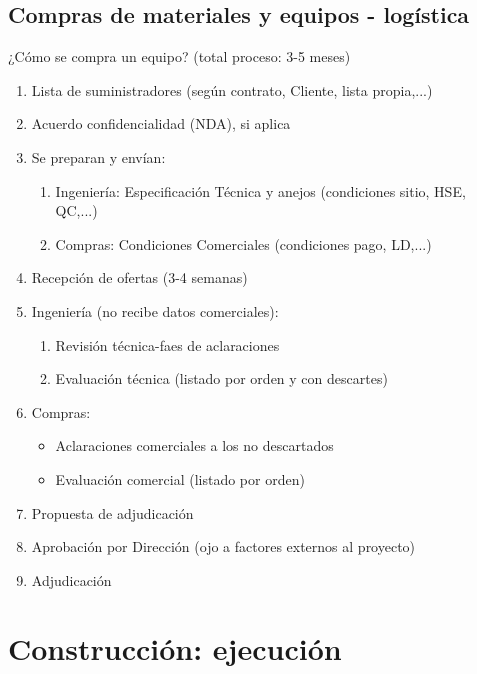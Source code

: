 \subsection*{Compras de materiales y equipos - logística}

¿Cómo se compra un equipo? (total proceso: 3-5 meses)
\begin{enumerate}
    \item Lista de suministradores (según contrato, Cliente, lista propia,...)
    \item Acuerdo confidencialidad (NDA), si aplica
    \item Se preparan y envían:
    \begin{enumerate}
        \item Ingeniería: Especificación Técnica y anejos (condiciones sitio, HSE, QC,...)
        \item Compras: Condiciones Comerciales (condiciones pago, LD,...)
    \end{enumerate}
    \item Recepción de ofertas (3-4 semanas)
    \item Ingeniería (no recibe datos comerciales):
    \begin{enumerate}
        \item Revisión técnica-faes de aclaraciones
        \item Evaluación técnica (listado por orden y con descartes)
    \end{enumerate}
    \item Compras:
    \begin{itemize}
        \item Aclaraciones comerciales a los no descartados
        \item Evaluación comercial (listado por orden)
    \end{itemize}
    \item Propuesta de adjudicación
    \item Aprobación por Dirección (ojo a factores externos al proyecto)
    \item Adjudicación
\end{enumerate}

\section{Construcción: ejecución}

